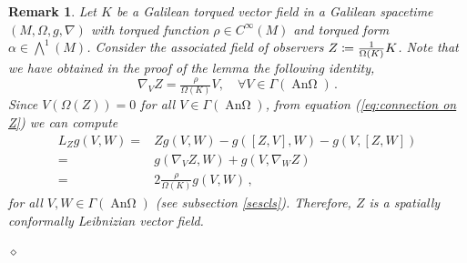 \documentclass[12pt]{article}
\newcommand{\coloneq}{\vcentcolon\mathrel{\mkern -1.2mu}\mathrel{=}}
\newcommand{\spacetime}{(M,\Omega,g,\nabla)}
\DeclareMathOperator{\An}{\text{An}\Omega}
\newtheorem{rem}[defi]{Remark}
\begin{document}
\begin{rem}\label{rem:torqued}
\upshape
    Let $K$ be a Galilean torqued vector field in a Galilean spacetime $\spacetime$ with torqued function $\rho\in C^\infty(M)$ and torqued form $\alpha \in \bigwedge^1(M)$. Consider the associated field of observers $Z\coloneq\tfrac{1}{\Omega(K)} K$. Note that we have obtained in the proof of the lemma the following identity,
    \begin{equation}\label{eq:connection on Z}
        \nabla_V Z = \tfrac{\rho}{\Omega(K)} V, \quad \forall V\in \Gamma(\An)\,.
    \end{equation}
    Since $V(\Omega(Z)) = 0$ for all $V\in \Gamma(\An)$, from equation (\ref{eq:connection on Z}) we can compute 
    \begin{equation*}
    \begin{split}
        L_Z g(V,W) ={}& Z g(V,W) - g([Z,V],W) - g(V, [Z,W]) \\
        ={}& g(\nabla_V Z, W) + g(V, \nabla_W Z) \\
        ={}& 2 \tfrac{\rho}{\Omega(K)} g(V,W)\,,
    \end{split}
    \end{equation*}
    for all $V,W\in \Gamma(\An)$ (see subsection \ref{sescls}).
    Therefore, $Z$ is a spatially conformally Leibnizian vector field.

    \hfill $\diamond$
\end{rem}
\end{document}
